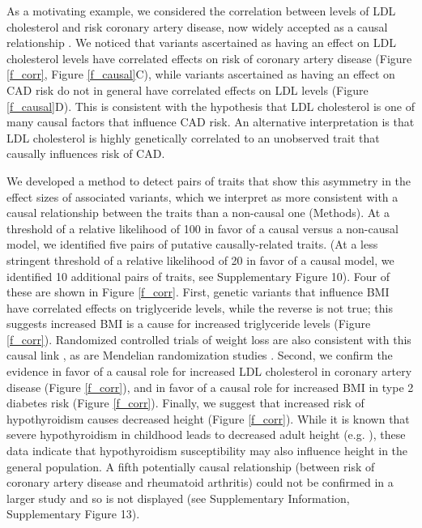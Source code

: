 \documentclass[11pt,titlepage]{article}
\begin{document}
As a motivating example, we considered the correlation between levels of LDL cholesterol and risk coronary artery disease, now widely accepted as a causal relationship \citep{:1994aa}. 
We noticed that variants ascertained as having an effect on LDL cholesterol levels have correlated effects on risk of coronary artery disease (Figure \ref{f_corr}, Figure \ref{f_causal}C), while variants ascertained as having an effect on CAD risk do not in general have correlated effects on LDL levels (Figure \ref{f_causal}D). 
This is consistent with the hypothesis that LDL cholesterol is one of many causal factors that influence CAD risk. 
An alternative interpretation is that LDL cholesterol is highly genetically correlated to an unobserved trait that causally influences risk of CAD. 

We developed a method to detect pairs of traits that show this asymmetry in the effect sizes of associated variants, which we interpret as more consistent with a causal relationship between the traits than a non-causal one (Methods).
At a threshold of a relative likelihood of 100 in favor of a causal versus a non-causal model, we identified five pairs of putative causally-related traits. (At a less stringent threshold of a relative likelihood of 20 in favor of a causal model, we identified 10 additional pairs of traits, see Supplementary Figure 10). 
Four of these are shown in Figure \ref{f_corr}. 
First, genetic variants that influence BMI have correlated effects on triglyceride levels, while the reverse is not true; this suggests increased BMI is a cause for increased triglyceride levels (Figure \ref{f_corr}).
Randomized controlled trials of weight loss are also consistent with this causal link \citep{Look-AHEAD-Research-Group:2007aa, Shai:2008aa}, as are Mendelian randomization studies \citep{Wurtz:2014aa, Freathy:2008aa}.
Second, we confirm the evidence in favor of a causal role for increased LDL cholesterol in coronary artery disease (Figure \ref{f_corr}), and in favor of a causal role for increased BMI in type 2 diabetes risk (Figure \ref{f_corr}). 
Finally, we suggest that increased risk of hypothyroidism causes decreased height (Figure \ref{f_corr}). 
While it is known that severe hypothyroidism in childhood leads to decreased adult height (e.g. \citet{Rivkees:1988aa}), these data indicate that hypothyroidism susceptibility may also influence height in the general population.  
A fifth potentially causal relationship (between risk of coronary artery disease and rheumatoid arthritis) could not be confirmed in a larger study and so is not displayed (see Supplementary Information, Supplementary Figure 13).
\end{document}
